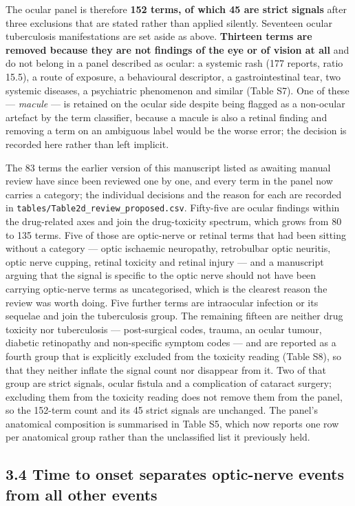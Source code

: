 \documentclass[utf8]{FrontiersinVancouver}
\begin{document}
The ocular panel is therefore \textbf{152 terms, of which 45 are strict signals} after three exclusions that are stated rather than applied silently. Seventeen ocular tuberculosis manifestations are set aside as above. \textbf{Thirteen terms are removed because they are not findings of the eye or of vision at all} and do not belong in a panel described as ocular: a systemic rash (177 reports, ratio 15.5), a route of exposure, a behavioural descriptor, a gastrointestinal tear, two systemic diseases, a psychiatric phenomenon and similar (Table S7). One of these --- \textit{macule} --- is retained on the ocular side despite being flagged as a non-ocular artefact by the term classifier, because a macule is also a retinal finding and removing a term on an ambiguous label would be the worse error; the decision is recorded here rather than left implicit.

The 83 terms the earlier version of this manuscript listed as awaiting manual review have since been reviewed one by one, and every term in the panel now carries a category; the individual decisions and the reason for each are recorded in \texttt{tables/Table2d\_review\_proposed.csv}. Fifty-five are ocular findings within the drug-related axes and join the drug-toxicity spectrum, which grows from 80 to 135 terms. Five of those are optic-nerve or retinal terms that had been sitting without a category --- optic ischaemic neuropathy, retrobulbar optic neuritis, optic nerve cupping, retinal toxicity and retinal injury --- and a manuscript arguing that the signal is specific to the optic nerve should not have been carrying optic-nerve terms as uncategorised, which is the clearest reason the review was worth doing. Five further terms are intraocular infection or its sequelae and join the tuberculosis group. The remaining fifteen are neither drug toxicity nor tuberculosis --- post-surgical codes, trauma, an ocular tumour, diabetic retinopathy and non-specific symptom codes --- and are reported as a fourth group that is explicitly excluded from the toxicity reading (Table S8), so that they neither inflate the signal count nor disappear from it. Two of that group are strict signals, ocular fistula and a complication of cataract surgery; excluding them from the toxicity reading does not remove them from the panel, so the 152-term count and its 45 strict signals are unchanged. The panel's anatomical composition is summarised in Table S5, which now reports one row per anatomical group rather than the unclassified list it previously held.

\subsection{3.4 Time to onset separates optic-nerve events from all other events}
\end{document}
